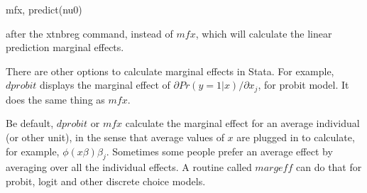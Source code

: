 mfx, predict(nu0)

after the xtnbreg command, instead of $mfx$, which will calculate the
linear prediction marginal effects.

There are other options to calculate marginal effects in Stata.  For
example, $dprobit$ displays the marginal effect of $\partial Pr(y=1|x)
/ \partial x_j$, for probit model.  It does the same thing as $mfx$.

Be default, $dprobit$ or $mfx$ calculate the marginal effect for an
average individual (or other unit), in the sense that average values
of $x$ are plugged in to calculate, for example, $\phi(x \beta)
\beta_j$.  Sometimes some people prefer an average effect by averaging
over all the individual effects.  A routine called $margeff$ can do
that for probit, logit and other discrete choice models.
